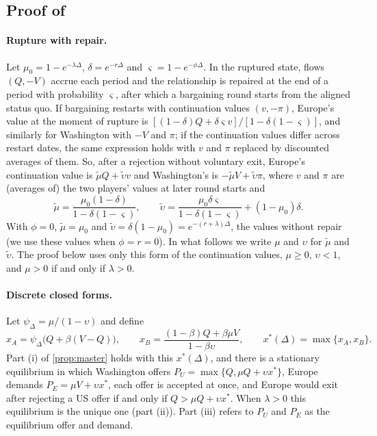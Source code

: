 \subsection{Proof of \texorpdfstring{}{bargaining with rupture risk}}

\paragraph{Rupture with repair.} Let $\mu_0=1-e^{-\lambda\Delta}$, $\delta=e^{-r\Delta}$ and $\varsigma=1-e^{-\phi\Delta}$. In the ruptured state, flows $(Q,-V)$ accrue each period and the relationship is repaired at the end of a period with probability $\varsigma$, after which a bargaining round starts from the aligned status quo. If bargaining restarts with continuation values $(v,-\pi)$, Europe's value at the moment of rupture is $[(1-\delta)Q+\delta\varsigma v]/[1-\delta(1-\varsigma)]$, and similarly for Washington with $-V$ and $\pi$; if the continuation values differ across restart dates, the same expression holds with $v$ and $\pi$ replaced by discounted averages of them. So, after a rejection without voluntary exit, Europe's continuation value is $\tilde\mu Q+\tilde\upsilon v$ and Washington's is $-\tilde\mu V+\tilde\upsilon\pi$, where $v$ and $\pi$ are (averages of) the two players' values at later round starts and
\[
\tilde\mu=\frac{\mu_0(1-\delta)}{1-\delta(1-\varsigma)},\qquad \tilde\upsilon=\frac{\mu_0\delta\varsigma}{1-\delta(1-\varsigma)}+(1-\mu_0)\delta .
\]
With $\phi=0$, $\tilde\mu=\mu_0$ and $\tilde\upsilon=\delta(1-\mu_0)=e^{-(r+\lambda)\Delta}$, the values without repair (we use these values when $\phi=r=0$). In what follows we write $\mu$ and $\upsilon$ for $\tilde\mu$ and $\tilde\upsilon$. The proof below uses only this form of the continuation values, $\mu\ge0$, $\upsilon<1$, and $\mu>0$ if and only if $\lambda>0$.

\paragraph{Discrete closed forms.} Let $\psi_\Delta=\mu/(1-\upsilon)$ and define
\[
x_A=\psi_\Delta\big(Q+\beta(V-Q)\big),\qquad
x_B=\frac{(1-\beta)Q+\beta\mu V}{1-\beta\upsilon},\qquad
x^*(\Delta)=\max\{x_A,x_B\}.
\]
Part (i) of \cref{prop:master} holds with this $x^*(\Delta)$, and there is a stationary equilibrium in which Washington offers $P_U=\max\{Q,\mu Q+\upsilon x^*\}$, Europe demands $P_E=\mu V+\upsilon x^*$, each offer is accepted at once, and Europe would exit after rejecting a US offer if and only if $Q>\mu Q+\upsilon x^*$. When $\lambda>0$ this equilibrium is the unique one (part (ii)). Part (iii) refers to $P_U$ and $P_E$ as the equilibrium offer and demand.

